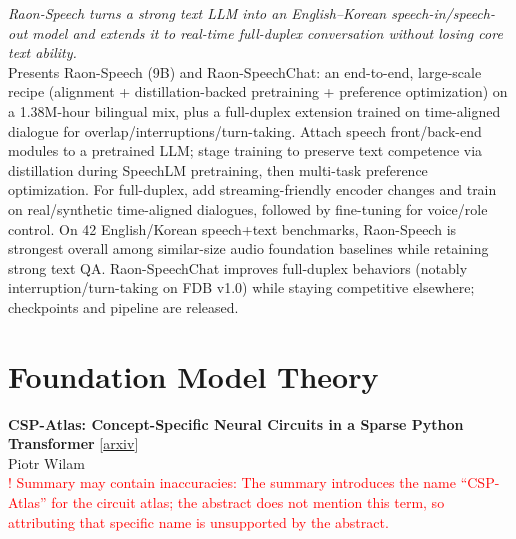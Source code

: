 \documentclass[12pt,letterpaper]{article}
\begin{document}
{\small\textit{Raon-Speech turns a strong text LLM into an English--Korean speech-in/speech-out model and extends it to real-time full-duplex conversation without losing core text ability.}}\\[1pt]
{\footnotesize Presents Raon-Speech (9B) and Raon-SpeechChat: an end-to-end, large-scale recipe (alignment + distillation-backed pretraining + preference optimization) on a 1.38M-hour bilingual mix, plus a full-duplex extension trained on time-aligned dialogue for overlap/interruptions/turn-taking. Attach speech front/back-end modules to a pretrained LLM; stage training to preserve text competence via distillation during SpeechLM pretraining, then multi-task preference optimization. For full-duplex, add streaming-friendly encoder changes and train on real/synthetic time-aligned dialogues, followed by fine-tuning for voice/role control. On 42 English/Korean speech+text benchmarks, Raon-Speech is strongest overall among similar-size audio foundation baselines while retaining strong text QA. Raon-SpeechChat improves full-duplex behaviors (notably interruption/turn-taking on FDB v1.0) while staying competitive elsewhere; checkpoints and pipeline are released.}

\medskip


\section*{Foundation Model Theory}

{\small\textbf{CSP-Atlas: Concept-Specific Neural Circuits in a Sparse Python Transformer}} {\scriptsize[\href{https://arxiv.org/abs/2605.24603}{arxiv}]}\\
{\scriptsize Piotr Wilam}\\

{\scriptsize\textcolor{red}{! Summary may contain inaccuracies: The summary introduces the name ``CSP-Atlas'' for the circuit atlas; the abstract does not mention this term, so attributing that specific name is unsupported by the abstract.}}\\[1pt]
\end{document}
